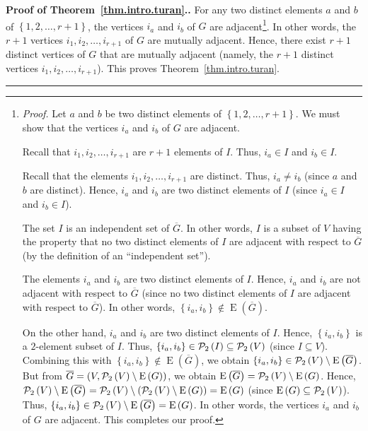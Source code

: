 \documentclass[numbers=enddot,12pt,final,onecolumn,notitlepage]{scrartcl}%
\theoremstyle{definition}
\newenvironment{proof}[1][Proof]{\noindent\textbf{#1.} }{\ \rule{0.5em}{0.5em}}
\newcommand{\powset}[2][]{\ifthenelse{\equal{#2}{}}{\mathcal{P}\left(#1\right)}{\mathcal{P}_{#1}\left(#2\right)}}
\newcommand{\set}[1]{\left\{ #1 \right\}}
\newcommand{\tup}[1]{\left( #1 \right)}
\newcommand{\edges}[1]{\operatorname{E}\left( #1 \right)}
\begin{document}
\begin{proof}[Proof of Theorem~\ref{thm.intro.turan}.]
For any two distinct elements $a$ and $b$ of
$\set{1, 2, \ldots, r+1}$, the vertices $i_a$ and $i_b$ of $G$ are
adjacent\footnote{\textit{Proof.}
  Let $a$ and $b$ be two distinct elements of
  $\set{1, 2, \ldots, r+1}$.
  We must show that the vertices $i_a$ and $i_b$ of $G$ are adjacent.
  \par
  Recall that $i_1, i_2, \ldots, i_{r+1}$ are $r + 1$ elements of $I$.
  Thus, $i_a \in I$ and $i_b \in I$.
  \par
  Recall that the elements $i_1, i_2, \ldots, i_{r+1}$ are distinct.
  Thus, $i_a \neq i_b$ (since $a$ and $b$ are distinct).
  Hence, $i_a$ and $i_b$ are two distinct elements of $I$ (since
  $i_a \in I$ and $i_b \in I$).
  \par
  The set $I$ is an independent set of $\overline{G}$.
  In other words, $I$ is a subset of $V$ having the property that
  no two distinct elements of $I$ are adjacent with respect to
  $\overline{G}$ (by the definition of an ``independent set'').
  \par
  The elements $i_a$ and $i_b$ are two distinct elements of $I$.
  Hence, $i_a$ and $i_b$ are not adjacent with respect to
  $\overline{G}$ (since no two distinct elements of $I$ are adjacent
  with respect to $\overline{G}$).
  In other words, $\set{i_a, i_b} \notin \edges{\overline{G}}$.
  \par
  On the other hand, $i_a$ and $i_b$ are two distinct elements of $I$.
  Hence, $\set{i_a, i_b}$ is a $2$-element subset of $I$.
  Thus, $\set{i_a, i_b} \in \powset[2]{I} \subseteq \powset[2]{V}$
  (since $I \subseteq V$).
  Combining this with $\set{i_a, i_b} \notin \edges{\overline{G}}$,
  we obtain
  $\set{i_a, i_b} \in \powset[2]{V} \setminus \edges{\overline{G}}$.
  But from
  $\overline{G} = \tup{V, \powset[2]{V} \setminus \edges{G}}$, we
  obtain
  $\edges{\overline{G}} = \powset[2]{V} \setminus \edges{G}$.
  Hence,
  $\powset[2]{V} \setminus \edges{\overline{G}}
  = \powset[2]{V} \setminus
      \tup{\powset[2]{V} \setminus \edges{G}}
  = \edges{G}$
  (since $\edges{G} \subseteq \powset[2]{V}$).
  Thus,
  $\set{i_a, i_b} \in \powset[2]{V} \setminus \edges{\overline{G}}
  = \edges{G}$.
  In other words, the vertices $i_a$ and $i_b$ of $G$ are adjacent.
  This completes our proof.}.
In other words, the $r + 1$ vertices $i_1, i_2, \ldots, i_{r + 1}$ of
$G$ are mutually adjacent.
Hence, there exist $r + 1$ distinct vertices of $G$ that are mutually
adjacent (namely, the $r + 1$ distinct vertices
$i_1, i_2, \ldots, i_{r+1}$).
This proves Theorem~\ref{thm.intro.turan}.
\end{proof}
\end{document}

